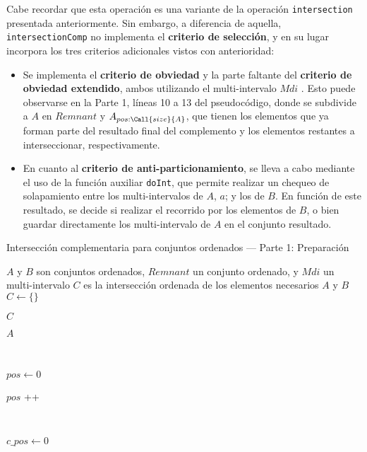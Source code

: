 Cabe recordar que esta operación es una variante de la operación \texttt{intersection} presentada anteriormente. Sin embargo, a diferencia de aquella, \texttt{intersectionComp} no implementa el \textbf{criterio de selección}, y en su lugar incorpora los tres criterios adicionales vistos con anterioridad:

\begin{itemize}
    \item Se implementa el \textbf{criterio de obviedad} y la parte faltante del \textbf{criterio de obviedad extendido}, ambos utilizando el multi-intervalo $Mdi$ . Esto puede observarse en la Parte 1, líneas 10 a 13 del pseudocódigo, donde se subdivide a $A$ en $Remnant$ y $A_{pos:\Call{size}{A}}$, que tienen los elementos que ya forman parte del resultado final del complemento y los elementos restantes a interseccionar, respectivamente.

    \item En cuanto al \textbf{criterio de anti-particionamiento}, se lleva a cabo mediante el uso de la función auxiliar \texttt{doInt}, que permite realizar un chequeo de solapamiento entre los multi-intervalos de $A$, $a$; y los de $B$. En función de este resultado, se decide si realizar el recorrido por los elementos de $B$, o bien guardar directamente los multi-intervalo de $A$ en el conjunto resultado.
\end{itemize}


\begin{algorithm}
\caption{Intersección complementaria para conjuntos ordenados — Parte 1: Preparación}
\begin{algorithmic}[1]
\Require $A$ y $B$ son conjuntos ordenados, $Remnant$ un conjunto ordenado, y $Mdi$ un multi-intervalo
\Ensure $C$ es la intersección ordenada de los elementos necesarios $A$ y $B$
    \State $C \gets \{\}$
    
        \State \Return $C$
    \EndIf

        \State \Return $A$
    \EndIf

    \ 
    
    \State $pos \gets 0$
    
        \State {}
        \State $pos$ \!+\!+
    \EndWhile

    
    \ 
    
    \State $c\_pos \gets 0$
\EndFunction
\end{algorithmic}
\end{algorithm}


